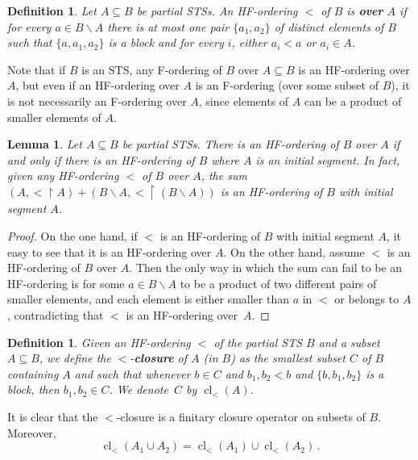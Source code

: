 \documentclass[a4paper, 11pt]{article}
\DeclareMathOperator{\cl}{cl}
\theoremstyle{note}
\newtheorem{lemma}[thm]{Lemma}
\newtheorem{df}[thm]{Definition}
\begin{document}
	
\begin{df}	Let   $A\subseteq B$ be partial STSs. An HF-ordering $<$ of $B$ is \textbf{over} $A$ if  for every $a\in B\smallsetminus A$ there is at most one pair $\{a_1,a_2\}$ of distinct elements of $B$ such that $\{a,a_1,a_2\}$ is a block and  for every $i$, either $a_i<a$ or $a_i\in A$. 
	\end{df}
	
	Note that if $B$ is an STS, any F-ordering  of $B$ over $A\subseteq B$  is an HF-ordering over $A$, but even if an HF-ordering over $A$ is an F-ordering (over some subset of $B$), it is not necessarily an F-ordering over $A$, since elements of $A$  can be a product of smaller elements of $A$.
	
\begin{lemma}\label{order-over}
	Let $A\subseteq B$ be partial STSs. There is an HF-ordering of $B$ over $A$ if and only if there is an HF-ordering of $B$ where $A$ is an initial segment. In fact, given any HF-ordering $<$ of $B$ over $A$, the sum $(A,<\restriction A)+(B\smallsetminus A, <\restriction (B\smallsetminus A))$ is an HF-ordering of $B$ with initial segment $A$.
\end{lemma}	
\begin{proof}
	On the one hand, if $<$ is an HF-ordering of $B$ with initial segment $A$, it easy to see that it is an HF-ordering over $A$. On the other hand, assume $<$ is an HF-ordering of $B$ over $A$. Then the only way in which the sum can fail to be an HF-ordering is for some $a\in B \smallsetminus A$ to be a product of two different pairs of smaller elements, %
and each element is either smaller than $a$ in $<$ or belongs to $A$, contradicting that $<$ is an HF-ordering over~$A$.
\end{proof}
	
\begin{df} \label{dfclosure} Given an HF-ordering  $<$ of the partial STS $B$  and a subset $A\subseteq B$, we define the $<$-\textbf{closure} of $A$ (in $B$) as the smallest subset $C$ of $B$ containing $A$ and such that  whenever  $b\in C$ and  $b_1,b_2 < b$ and $\{b,b_1,b_2\}$ is a block, then  $b_1,b_2\in C$.  We denote~$C$ by  $\cl_<(A)$.  
	\end{df}  
It is clear that the $<$-closure is a finitary closure operator on subsets of $B$. Moreover,
\[\cl_<(A_1\cup A_2)= \cl_<(A_1) \cup \cl_<(A_2) \,.\]
\end{document}
